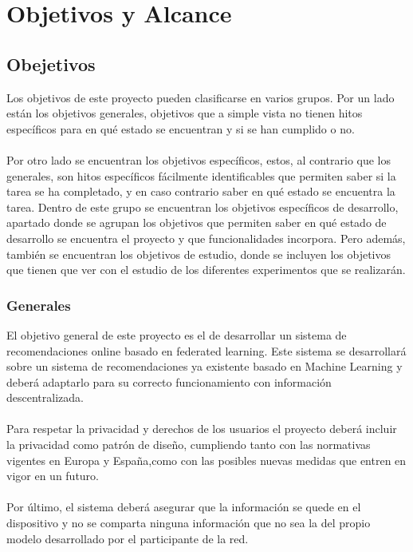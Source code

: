 \chapter{Objetivos y Alcance}\label{Obj}
\thispagestyle{fancy}
\section{Obejetivos}
Los objetivos de este proyecto pueden clasificarse en varios grupos. Por un lado están los objetivos generales, objetivos que a simple vista no tienen hitos específicos para en qué estado se encuentran y si se han cumplido o no.
\\\\
Por otro lado se encuentran los objetivos específicos, estos, al contrario que los generales, son hitos específicos fácilmente identificables que permiten saber si la tarea se ha completado, y en caso contrario saber en qué estado se encuentra la tarea. Dentro de este grupo se encuentran los objetivos específicos de desarrollo, apartado donde se agrupan los objetivos que permiten saber en qué estado de desarrollo se encuentra el proyecto y que funcionalidades incorpora. Pero además, también se encuentran los objetivos de estudio, donde se incluyen los objetivos que tienen que ver con el estudio de los diferentes experimentos que se realizarán. 

\subsection{Generales}
El objetivo general de este proyecto es el de desarrollar un sistema de recomendaciones online basado en federated learning. Este sistema se desarrollará sobre un sistema de recomendaciones ya existente basado en Machine Learning y deberá adaptarlo para su correcto funcionamiento con información descentralizada.
\\ \\
Para respetar la privacidad y derechos de los usuarios el proyecto deberá incluir la privacidad como patrón de diseño, cumpliendo tanto con las normativas vigentes en Europa y España,como con las posibles nuevas medidas que entren en vigor en un futuro. 
\\ \\
Por último, el sistema deberá asegurar que la información se quede en el dispositivo y no se comparta ninguna información que no sea la del propio modelo desarrollado por el participante de la red.

